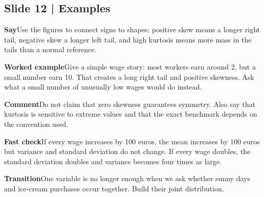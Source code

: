 \documentclass[11pt,a4paper]{article}
\newcommand{\slideheading}[1]{\subsection*{\color{accent}#1}}
\newcommand{\cue}[2]{\par\noindent\textbf{#1}\quad #2\par}
\begin{document}
\slideheading{Slide 12 | Examples}
\cue{Say}{Use the figures to connect signs to shapes: positive skew means a longer right tail, negative skew a longer left tail, and high kurtosis means more mass in the tails than a normal reference.}
\cue{Worked example}{Give a simple wage story: most workers earn around 2, but a small number earn 10. That creates a long right tail and positive skewness. Ask what a small number of unusually low wages would do instead.}
\cue{Comment}{Do not claim that zero skewness guarantees symmetry. Also say that kurtosis is sensitive to extreme values and that the exact benchmark depends on the convention used.}
\cue{Fast check}{If every wage increases by 100 euros, the mean increases by 100 euros but variance and standard deviation do not change. If every wage doubles, the standard deviation doubles and variance becomes four times as large.}
\cue{Transition}{One variable is no longer enough when we ask whether sunny days and ice-cream purchases occur together. Build their joint distribution.}
\end{document}

